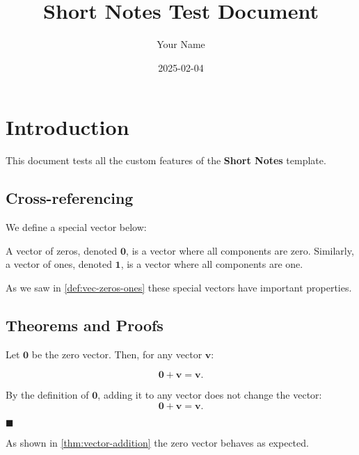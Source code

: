 \documentclass[
  14pt,
  a4paper,
]{extarticle}
\title{Short Notes Test Document}
\author{Your Name}
\date{2025-02-04}
\newcommand{\nmusemibold}{\fontseries{sb}\selectfont}
\renewenvironment{proof}{%
   \par\noindent{\color{nmuprimaryblue}\nmusemibold Proof:}\normalfont}{%
   \hfill$\blacksquare$\par}
\begin{document}
\maketitle
\section{Introduction}\label{introduction}

This document tests all the custom features of the \textbf{Short Notes}
template.

\subsection{Cross-referencing}\label{cross-referencing}

We define a special vector below:

\begin{definition}\label{def:vec-zeros-ones}

A vector of zeros, denoted \(\mathbf{0}\), is a vector where all
components are zero. Similarly, a vector of ones, denoted
\(\mathbf{1}\), is a vector where all components are one.

\end{definition}

As we saw in \autoref{def:vec-zeros-ones} these special vectors have
important properties.

\subsection{Theorems and Proofs}\label{theorems-and-proofs}

\begin{theorem}\label{thm:vector-addition}

Let \(\mathbf{0}\) be the zero vector. Then, for any vector
\(\mathbf{v}\):

\[
\mathbf{0} + \mathbf{v} = \mathbf{v}.
\]

\end{theorem}

\begin{proof}

By the definition of \(\mathbf{0}\), adding it to any vector does not
change the vector: \[
\mathbf{0} + \mathbf{v} = \mathbf{v}.
\]

\end{proof}

As shown in \autoref{thm:vector-addition} the zero vector behaves as
expected.
\end{document}
